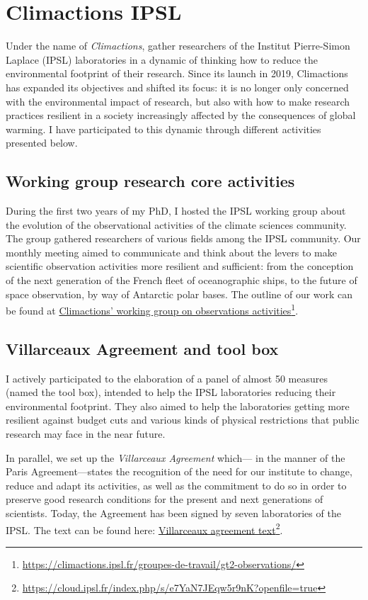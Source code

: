 \section*{Climactions IPSL}
    Under the name of \textit{Climactions}, gather researchers of the Institut Pierre-Simon Laplace (IPSL) laboratories in a dynamic of thinking how to reduce the environmental footprint of their research. Since its launch in 2019, Climactions has expanded its objectives and shifted its focus: it is no longer only concerned with the environmental impact of research, but also with how to make research practices resilient in a society increasingly affected by the consequences of  global warming.
    I have participated to this dynamic through different activities presented below.

    \subsection*{Working group research core activities}
    During the first two years of my PhD, I hosted the IPSL working group about the evolution of the observational activities of the climate sciences community.
    The group gathered researchers of various fields among the IPSL community. Our monthly meeting aimed to communicate and think about the levers to make scientific observation activities more resilient and sufficient: from the conception of the next generation of the French fleet of oceanographic ships, to the future of space observation, by way of Antarctic polar bases. 
    The outline of our work can be found at \href{https://climactions.ipsl.fr/groupes-de-travail/gt2-observations/}{Climactions' working group on observations activities}\footnote{\url{https://climactions.ipsl.fr/groupes-de-travail/gt2-observations/}}.


    \subsection*{Villarceaux Agreement and tool box}
    I actively participated to the elaboration of a panel of almost \num{50} measures (named the tool box), intended to help the IPSL laboratories reducing their environmental footprint. They also aimed to help the laboratories getting more resilient against budget cuts and various kinds of physical restrictions that public research may face in the near future. 

    In parallel, we set up the \textit{Villarceaux Agreement} which\---- in the manner of the Paris Agreement\----states the recognition of the need for our institute to change, reduce and adapt its activities, as well as the commitment to do so in order to preserve good research conditions for the present and next generations of scientists.
    Today, the Agreement has been signed by seven laboratories of the IPSL. The text can be found here: \href{https://cloud.ipsl.fr/index.php/s/e7YaN7JEqw5r9nK?openfile=true}{Villarceaux agreement text}\footnote{\url{https://cloud.ipsl.fr/index.php/s/e7YaN7JEqw5r9nK?openfile=true}}.

